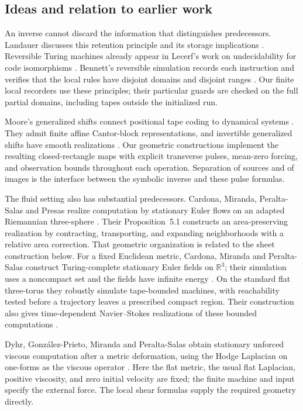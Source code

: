 \subsection{Ideas and relation to earlier work}
An inverse cannot discard the information that distinguishes predecessors.
Landauer discusses this retention principle and its storage implications
\cite[Section~3]{Landauer1961}.  Reversible Turing machines already
appear in Lecerf's work on undecidability for code isomorphisms
\cite{Lecerf1963}.  Bennett's reversible simulation records each
instruction and verifies that the local rules have disjoint domains and
disjoint ranges \cite[Eqs.~(5)--(11) and Table~1]{Bennett1973}.
Our finite local recorders use these principles; their particular guards
are checked on the full partial domains, including tapes outside the
initialized run.

Moore's generalized shifts connect positional tape coding to dynamical
systems \cite{Moore1990}.  They admit finite affine Cantor-block
representations, and invertible generalized shifts have smooth
realizations \cite[Lemma~0 and Section~6]{Moore1991}.
Our geometric constructions implement the resulting closed-rectangle
maps with explicit transverse pulses, mean-zero forcing, and observation
bounds throughout each operation.  Separation of sources and of images
is the interface between the symbolic inverse and these pulse formulas.

The fluid setting also has substantial predecessors.  Cardona, Miranda,
Peralta-Salas and Presas realize computation by stationary Euler flows
on an adapted Riemannian three-sphere \cite{CMPP}.  Their
Proposition~5.1 constructs an area-preserving realization by contracting,
transporting, and expanding neighborhoods with a relative area correction.
That geometric organization is related to the sheet construction below.
For a fixed Euclidean metric, Cardona, Miranda and Peralta-Salas
construct Turing-complete stationary Euler fields on $\mathbb R^3$;
their simulation uses a noncompact set and the fields have infinite
energy \cite{CMP2023}.  On the standard flat three-torus they robustly
simulate tape-bounded machines, with reachability tested before a
trajectory leaves a prescribed compact region.  Their construction also
gives time-dependent Navier--Stokes realizations of these bounded
computations \cite{CMP2023}.

Dyhr, Gonz\'alez-Prieto, Miranda and Peralta-Salas obtain stationary
unforced viscous computation after a metric deformation, using the
Hodge Laplacian on one-forms as the viscous operator
\cite[Theorem~A and Proposition~3.1]{DGMP}.  Here the flat metric,
the usual flat Laplacian, positive viscosity, and zero initial velocity
are fixed; the finite machine and input specify the external force.
The local shear formulas supply the required geometry directly.

